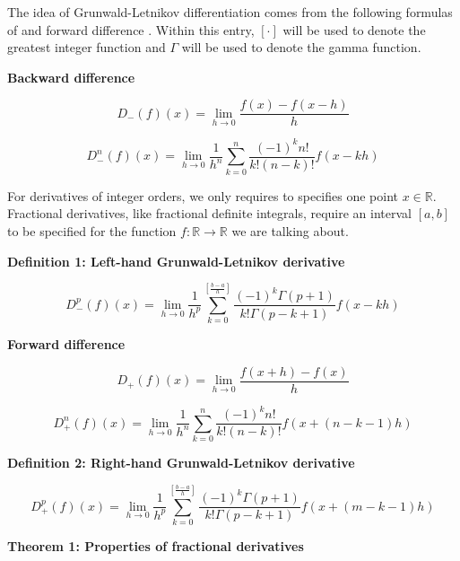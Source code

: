\documentclass[12pt]{article}
\begin{document}
The idea of Grunwald-Letnikov differentiation comes from the following formulas of  and forward difference . Within this entry, $[ \cdot ]$ will be used to denote the greatest integer function and $\Gamma$ will be used to denote the gamma function.

{\bf Backward difference} 

\begin{equation}D_{-}(f)(x) = \lim_{h\to 0}\frac{f(x)-f(x-h)}{h} 
\end{equation}

\begin{equation}D^n_{-}(f)(x)=\lim_{h\to 0}\frac{1}{h^n}\sum_{k=0}^n
\frac{(-1)^k n!}{k! (n-k)!}f(x-kh) \end{equation}

For derivatives of integer orders, we only requires to specifies one point $x\in {\mathbb R}$. Fractional derivatives, like fractional definite integrals, require an interval $[a,b]$ to be specified for the function $f:{\mathbb R}\to {\mathbb R}$ we are talking about.

{\bf Definition 1:  Left-hand Grunwald-Letnikov derivative} 

\begin{equation}D^p_{-}(f)(x)=
\lim_{h\to 0}\frac{1}{h^p}\sum_{k=0}^{\left[\frac{b-a}{h}\right]}
\frac{(-1)^k\Gamma (p+1)}{k! \Gamma (p-k+1)} f(x-kh) \end{equation}

{\bf Forward difference}

\begin{equation}D_{+}(f)(x) = \lim_{h\to 0}\frac{f(x+h)-f(x)}{h}
\end{equation}

\begin{equation}D^n_{+}(f)(x) = \lim_{h\to 0}\frac{1}{h^n}\sum^n_{k=0}
\frac{(-1)^k n!}{k! (n-k)!} f(x+(n-k-1)h) \end{equation}

{\bf Definition 2:  Right-hand Grunwald-Letnikov derivative}

\begin{equation}D^p_{+}(f)(x)=
\lim_{h\to 0}\frac{1}{h^p}\sum_{k=0}^{\left[\frac{b-a}{h}\right]}
\frac{(-1)^k\Gamma (p+1)}{k! \Gamma (p-k+1)} f(x+(m-k-1)h) \end{equation}

{\bf Theorem 1: Properties of fractional derivatives}
\end{document}
